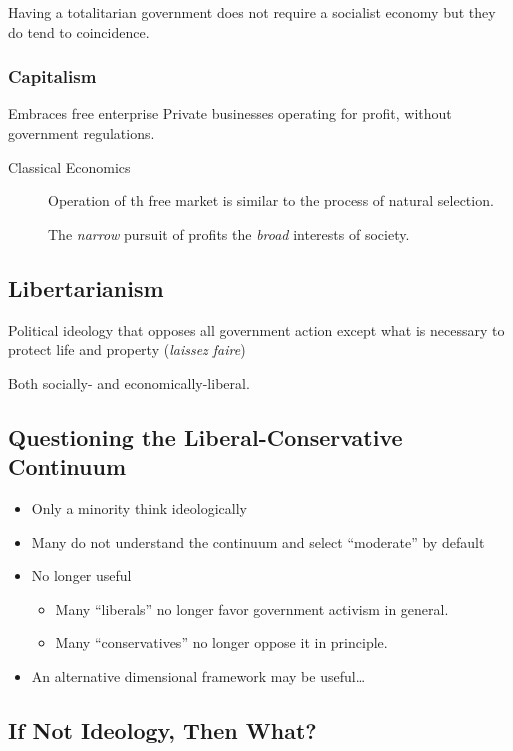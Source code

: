 Having a totalitarian government does not require a socialist economy but they do tend to coincidence.

\subsubsection{Capitalism}
Embraces free enterprise
Private businesses operating for profit, without government regulations.
\begin{description}
    \item[Classical Economics] Operation of th free market is similar to the process of natural selection.
    
    The \textit{narrow} pursuit of profits the \textit{broad} interests of society.
\end{description}

\subsection{Libertarianism}
Political ideology that opposes all government action except what is necessary to protect life and property (\textit{laissez faire})

Both socially- and economically-liberal.

\subsection{Questioning the Liberal-Conservative Continuum}
\begin{itemize}
    \item Only a minority think ideologically
    \item Many do not understand the continuum and select ``moderate'' by default
    \item No longer useful
    \begin{itemize}
        \item Many ``liberals'' no longer favor government activism in general.
        \item Many ``conservatives'' no longer oppose it in principle.
    \end{itemize}
    \item An alternative dimensional framework may be useful\ldots
\end{itemize}

\subsection{If Not Ideology, Then What?}
